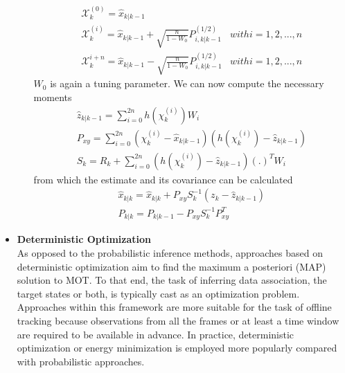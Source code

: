 \begin{itemize}
\begin{enumerate}
                                    \begin{align}
                                        \mathcal{X}_k^{(0)} = \hat{x}_{k|k-1} \\
                                        \mathcal{X}_k^{(i)} = \hat{x}_{k|k-1} + \sqrt{\frac{n}{1-W_0}} P_{i,k|k-1}^{(1/2)} & with i = 1,2,...,n \\
                                        \mathcal{X}_k^{i+n} = \hat{x}_{k|k-1} - \sqrt{\frac{n}{1-W_0}} P_{i,k|k-1}^{(1/2)} & with i = 1,2,...,n
                                    \end{align}
                                    \emph{$W_0$} is again a tuning parameter. We can now compute the necessary moments
                                    \begin{align}
                                        \hat{z}_{k|k-1} = \displaystyle\sum_{i=0}^{2n} h(\chi_k^{(i)}) W_i \\ 
                                        P_{xy} = \displaystyle\sum_{i=0}^{2n} (\chi_k^{(i)} - \hat{x}_{k|k-1}) (h(\chi_k^{(i)}) - \hat{z}_{k|k-1}) \\ 
                                        S_k = R_k + \displaystyle\sum_{i=0}^{2n} (h(\chi_k^{(i)}) - \hat{z}_{k|k-1}) (.)^T W_i
                                    \end{align}
                                    from which the estimate and its covariance can be calculated 
                                    \begin{align}
                                        \hat{x}_{k|k} = \hat{x}_{k|k} + P_{xy} S_k^{-1} (z_k - \hat{z}_{k|k-1}) \\ 
                                        P_{k|k} = P_{k|k-1} - P_{xy} S_k^{-1} P_{xy}^T
                                    \end{align}
                            \end{enumerate}
            \item \textbf{Deterministic Optimization} \\ 
                \vspace{3mm}
                As opposed to the probabilistic inference methods, approaches based on deterministic optimization aim to find the maximum a posteriori (MAP) solution to MOT. To that end, the task of inferring data association, the target states or both, 
                is typically cast as an optimization problem. Approaches within this framework are more suitable for the task of offline tracking because observations from all the frames or at least a time window are required to be available in advance. 
                In practice, deterministic optimization or energy minimization is employed more popularly compared with probabilistic approaches.
        \end{itemize}


